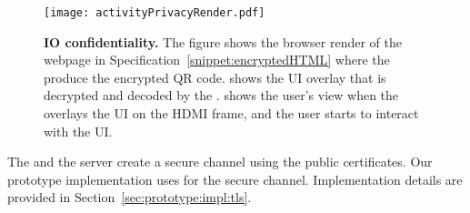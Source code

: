 \begin{figure}[t]
\centering
\texttt{[image: activityPrivacyRender.pdf]}
\caption{\textbf{\name IO confidentiality.} The figure shows \one the browser render of the webpage in Specification~\ref{snippet:encryptedHTML} where the \name \js produce the encrypted QR code. \two shows the UI overlay that is decrypted and decoded by the \device. \three shows the user's view when the \device overlays the UI on the HDMI frame, and the user starts to interact with the UI.}

\spacesave
\label{fig:activityPrivacy}
\centering
\end{figure}


 The \device and the server create a secure channel using the public certificates. Our prototype implementation uses \tls for the secure channel. Implementation details are provided in Section~\ref{sec:prototype:impl:tls}. 

